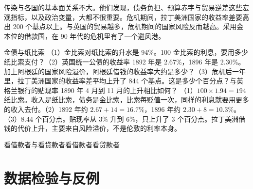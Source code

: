 传染与各国的基本面关系不大。他们发现，债务负担、预算赤字与贸易逆差这些宏观指标，以及政治变量，大都不很重要\cite{mitchener2007}。危机期间，拉丁美洲国家的收益率差要高出 200 个基点以上\cite{mitchener2007}。与英国的贸易越多，危机期间的国家风险反而越高\cite{mitchener2007}。采用金本位的借款国，在 90 年代的危机里有了一个避风港\cite{mitchener2007}。

\begin{example}{金债与纸比索}\label{ex:periph-peso}
（1）金比索对纸比索的升水是 94\%。100 金比索的利息，要用多少纸比索支付？（2）英国统一公债的收益率 1892 年是 2.67\%，1896 年是 2.30\%\cite{boe2017}。加上阿根廷的国家风险溢价，阿根廷借钱的收益率大约是多少？（3）危机后一年里，拉丁美洲国家的收益率差平均上升了 844 个基点。这是多少个百分点？与英格兰银行的贴现率 1890 年 4 月到 11 月的上升相比如何？
\solution （1）$100\times1.94=194$ 纸比索。收入是纸比索，债务是金比索，比索每贬值一次，同样的利息就要用更多的收入去付。（2）1892 年约 $2.67+14=16.7\%$，1896 年约 $2.30+8=10.3\%$。（3）8.44 个百分点。贴现率从 3\% 升到 6\%，只上升了 3 个百分点。拉丁美洲借钱的代价上升，主要来自风险溢价，不是伦敦的利率本身。
\end{example}

\begin{compare}{看借款者与看贷款者}{看借款者}{看贷款者}
\end{compare}

\section{数据检验与反例}\label{sec:periph-test}

